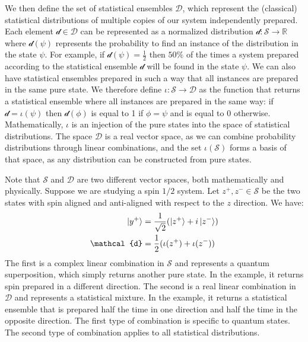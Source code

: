 \documentclass[11pt]{article}
\begin{document}
We then define the set of statistical ensembles $\mathcal{D}$, which represent the (classical) statistical distributions of multiple copies of our system independently prepared. Each element $\mathcal{d} \in \mathcal{D}$ can be represented as a normalized distribution $\mathcal{d}: \mathcal{S} \to \mathbb{R}$ where $\mathcal{d}(\psi)$ represents the probability to find an instance of the distribution in the state $\psi$. For example, if $\mathcal{d}(\psi) = \frac{1}{2}$ then $50\%$ of the times a system prepared according to the statistical ensemble $\mathcal{d}$ will be found in the state $\psi$. We can also have statistical ensembles prepared in such a way that all instances are prepared in the same pure state. We therefore define $\iota : \mathcal{S} \to \mathcal{D}$ as the function that returns a statistical ensemble where all instances are prepared in the same way: if $\mathcal{d}=\iota(\psi)$ then $\mathcal{d}(\phi)$ is equal to 1 if $\phi = \psi$ and is equal to 0 otherwise. Mathematically, $\iota$ is an injection of the pure states into the space of statistical distributions. The space $\mathcal{D}$ is a real vector space, as we can combine probability distributions through linear combinations, and the set $\iota(\mathcal{S})$ forms a basis of that space, as any distribution can be constructed from pure states.

Note that $\mathcal{S}$ and $\mathcal{D}$ are two different vector spaces, both mathematically and physically. Suppose we are studying a spin $1/2$ system. Let $z^+, z^- \in \mathcal{S}$ be the two states with spin aligned and anti-aligned with respect to the $z$ direction. We have:
\begin{equation}
\begin{aligned}
\ket{y^+} &= \frac{1}{\sqrt{2}} (\ket{z^+} + i \ket{z^-}) \\
\mathcal{d}&= \frac{1}{2} (\iota(z^+) + \iota(z^-))
\end{aligned}
\end{equation}
The first is a complex linear combination in $\mathcal{S}$ and represents a quantum superposition, which simply returns another pure state. In the example, it returns spin prepared in a different direction. The second is a real linear combination in $\mathcal{D}$ and represents a statistical mixture. In the example, it returns a statistical ensemble that is prepared half the time in one direction and half the time in the opposite direction. The first type of combination is specific to quantum states. The second type of combination applies to all statistical distributions.
\end{document}
